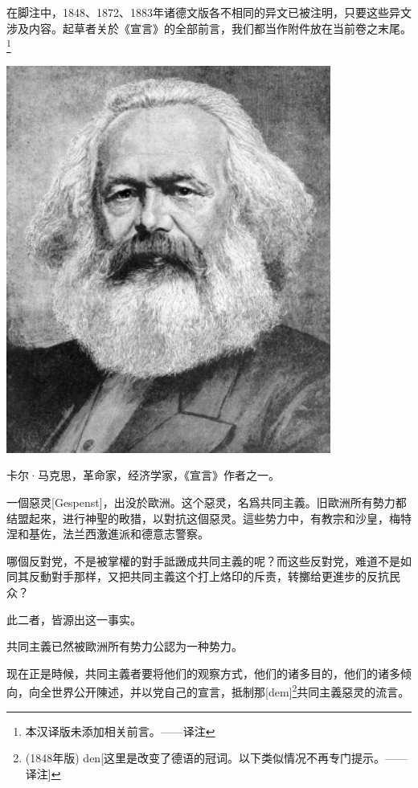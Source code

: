 \documentclass[a4paper,12pt]{ctexart}
\begin{document}
\begin{adjustwidth}{2.5cm}{2.5cm}
\vfill 在脚注中，1848、1872、1883年诸德文版各不相同的异文已被注明，只要这些异文涉及内容。起草者关於《宣言》的全部前言，我们都当作附件放在当前卷之末尾。\footnote{本汉译版未添加相关前言。——译注}
\end{adjustwidth}

\newpage
\thispagestyle{empty}
\vspace*{80pt}
\centerline{
\includegraphics[width=0.8\textwidth]{0111207237-Marx.jpg}
}
\begin{center}
卡尔·马克思，革命家，经济学家，《宣言》作者之一。
\end{center}

\newpage
\setcounter{page}{1}

一個惡灵[Gespenst]，出没於歐洲。这个惡灵，名爲共同主義。旧歐洲所有勢力都结盟起來，进行神聖的畋猎，以對抗这個惡灵。這些势力中，有教宗和沙皇，梅特涅和基佐，法兰西激進派和德意志警察。

哪個反對党，不是被掌權的對手詆譭成共同主義的呢？而这些反對党，难道不是如同其反動對手那样，又把共同主義这个打上烙印的斥责，转擲给更進步的反抗民众？

此二者，皆源出这一事实。

共同主義已然被歐洲所有势力公認为一种势力。

现在正是時候，共同主義者要将他们的观察方式，他们的诸多目的，他们的诸多倾向，向全世界公开陳述，并以党自己的宣言，抵制那[dem]\footnote{(1848年版) den[这里是改变了德语的冠词。以下类似情况不再专门提示。——译注]}共同主義惡灵的流言。
\end{document}

